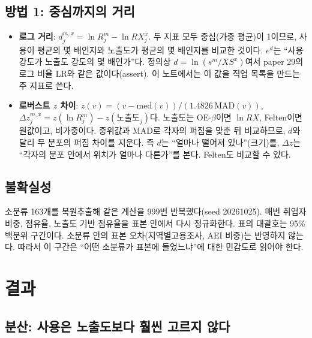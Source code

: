 \documentclass[11pt]{article}
\begin{document}
\subsection{방법 1: 중심까지의 거리}

\begin{itemize}[leftmargin=*]
  \item \textbf{로그 거리}: $d^{m,x}_j = \ln R^m_j - \ln RX^x_j$. 두 지표 모두 중심(가중 평균)이 1이므로, 사용이 평균의 몇 배인지와 노출도가 평균의 몇 배인지를 비교한 것이다. $e^{d}$는 ``사용 강도가 노출도 강도의 몇 배인가''다. 정의상 $d = \ln(s^m / XS^x)$여서 paper 29의 로그 비율 LR와 같은 값이다(assert). 이 노트에서는 이 값을 직업 목록을 만드는 주 지표로 쓴다.
  \item \textbf{로버스트 $z$ 차이}: $z(v) = (v - \mathrm{med}(v)) / (1.4826\,\mathrm{MAD}(v))$, $\Delta z^{m,x}_j = z(\ln R^m_j) - z(\text{노출도}_j)$다. 노출도는 OE$\cdot\beta$이면 $\ln RX$, Felten이면 원값이고, 비가중이다. 중위값과 MAD로 각자의 퍼짐을 맞춘 뒤 비교하므로, $d$와 달리 두 분포의 퍼짐 차이를 지운다. 즉 $d$는 ``얼마나 떨어져 있나''(크기)를, $\Delta z$는 ``각자의 분포 안에서 위치가 얼마나 다른가''를 본다. Felten도 비교할 수 있다.
\end{itemize}

\subsection{불확실성}

소분류 163개를 복원추출해 같은 계산을 999번 반복했다(seed 20261025). 매번 취업자 비중, 점유율, 노출도 기반 점유율을 표본 안에서 다시 정규화한다. 표의 대괄호는 95\% 백분위 구간이다. 소분류 안의 표본 오차(지역별고용조사, AEI 비중)는 반영하지 않는다. 따라서 이 구간은 ``어떤 소분류가 표본에 들었느냐''에 대한 민감도로 읽어야 한다.

\section{결과}

\subsection{분산: 사용은 노출도보다 훨씬 고르지 않다}
\end{document}
